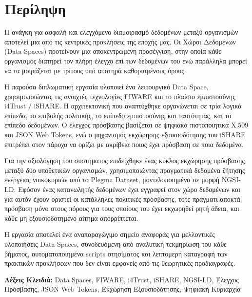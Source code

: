 \chapter*{Περίληψη}
\thispagestyle{plain}

Η ανάγκη για ασφαλή και ελεγχόμενο διαμοιρασμό δεδομένων μεταξύ οργανισμών
αποτελεί μια από τις κεντρικές προκλήσεις της εποχής μας.
Οι Χώροι Δεδομένων (\textlatin{Data Spaces}) προτείνουν μια αποκεντρωμένη
προσέγγιση, στην οποία κάθε οργανισμός διατηρεί τον πλήρη έλεγχο επί των
δεδομένων του ενώ παράλληλα μπορεί
να τα μοιράζεται με τρίτους υπό αυστηρά καθορισμένους όρους.

Η παρούσα διπλωματική εργασία υλοποιεί ένα λειτουργικό \textlatin{Data Space}, χρησιμοποιώντας τις
ανοιχτές τεχνολογίες \textlatin{FIWARE} και το πλαίσιο εμπιστοσύνης
\textlatin{i4Trust }/\textlatin{ iSHARE}. Η αρχιτεκτονική που αναπτύχθηκε
οργανώνεται σε τρία λογικά επίπεδα, το επιβολής πολιτικής, το επίπεδο εμπιστοσύνης και
ταυτότητας, και το επίπεδο δεδομένων. Ο έλεγχος πρόσβασης βασίζεται σε ψηφιακά
πιστοποιητικά \textlatin{X.509} και \textlatin{JSON Web Tokens}, ενώ ο
μηχανισμός εκχώρησης εξουσιοδότησης του \textlatin{iSHARE} επιτρέπει στον
πάροχο να ορίζει με ακρίβεια ποιος έχει πρόσβαση σε ποια δεδομένα.

Για την αξιολόγηση του συστήματος επιδείχθηκε ένας κύκλος εκχώρησης
πρόσβασης μεταξύ δύο υποθετικών οργανισμών, χρησιμοποιώντας πραγματικά
δεδομένα ζήτησης ενέργειας νοικοκυριών από το \textlatin{Plegma Dataset},
μοντελοποιημένα σε μορφή \textlatin{NGSI-LD}. Εφόσον ένας κατανωλητής δεδομένων έχει
εγγραφεί στον χώρο δεδομένων και για αυτόν έχουν οριστεί οι κατάλληλες πολιτικές πρόσβασης, 
τότε πράγματι αποκτά πρόσβαση μόνο στους πόρους για τους οποίους του έχει εκχωρηθεί ρητή άδεια, και κάθε
μη εξουσιοδοτημένο αίτημα απορρίπτεται.
 
Η εργασία αποτελεί ένα αναπαραγώγιμο σημείο αναφοράς για μελλοντικές
υλοποιήσεις \textlatin{Data Spaces}, συνοδευόμενη από αναλυτική τεκμηρίωση
του κάθε βήματος, αυτοματοποιημένα \textlatin{scripts} στησίματος και
λεπτομερή καταγραφή των πρακτικών προκλήσεων που δεν είναι εμφανείς από τις
θεωρητικές προδιαγραφές.

\vspace{1cm}
\flushleft \textbf{Λέξεις Κλειδιά:} \textlatin{Data Spaces}, \textlatin{FIWARE},
\textlatin{i4Trust}, \textlatin{iSHARE}, \textlatin{NGSI-LD}, Έλεγχος Πρόσβασης,
\textlatin{JSON Web Tokens}, Εκχώρηση Εξουσιοδότησης, Ψηφιακή Κυριαρχία
\blankpage
